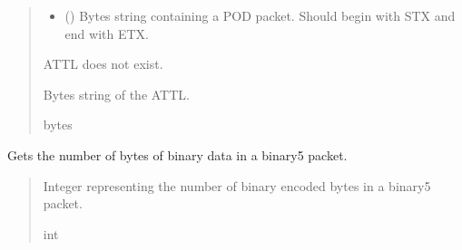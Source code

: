 \documentclass[letterpaper,10pt,english]{sphinxmanual}
\begin{document}
\begin{fulllineitems}
\begin{fulllineitems}
\begin{quote}
\begin{description}
\begin{itemize}
\item {} 
\sphinxAtStartPar
{} () \textendash{} Bytes string containing a POD packet. Should begin with STX and                 end with ETX.

\end{itemize}

\sphinxAtStartPar
{} \textendash{} ATTL does not exist.

\sphinxAtStartPar
Bytes string of the ATTL.

\sphinxAtStartPar
bytes

\end{description}\end{quote}

\end{fulllineitems}


\begin{fulllineitems}
\label{\detokenize{PodApi.Packets:PodApi.Packets.Binary5.PacketBinary5.GetBinaryLength}}
\pysigstartsignatures
{}
\pysigstopsignatures
\sphinxAtStartPar
Gets the number of bytes of binary data in a binary5 packet.
\begin{quote}\begin{description}
\sphinxAtStartPar
Integer representing the number of binary encoded bytes in a binary5 packet.

\sphinxAtStartPar
int

\end{description}\end{quote}

\end{fulllineitems}



\end{fulllineitems}
\end{document}
